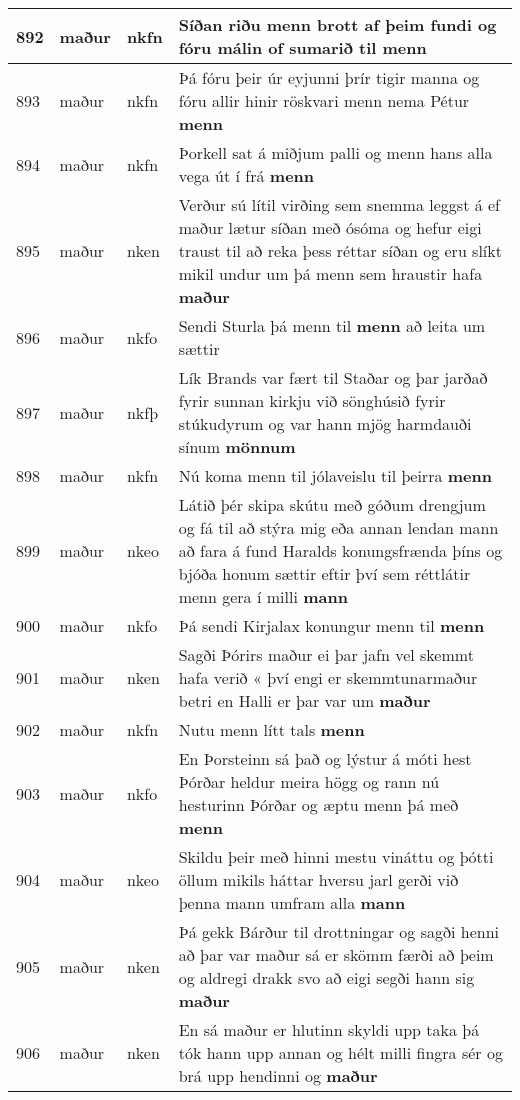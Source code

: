 \documentclass{article}
\begin{document}
\begin{longtable}{p{1cm}|p{1cm}|p{1cm}|p{13cm}}
\hline
892&maður&nkfn&Síðan riðu menn brott af þeim fundi og fóru málin of sumarið til \textbf{menn} \\
\hline
893&maður&nkfn&Þá fóru þeir úr eyjunni þrír tigir manna og fóru allir hinir röskvari menn nema Pétur \textbf{menn} \\
\hline
894&maður&nkfn&Þorkell sat á miðjum palli og menn hans alla vega út í frá \textbf{menn} \\
\hline
895&maður&nken&Verður sú lítil virðing sem snemma leggst á ef maður lætur síðan með ósóma og hefur eigi traust til að reka þess réttar síðan og eru slíkt mikil undur um þá menn sem hraustir hafa \textbf{maður} \\
\hline
896&maður&nkfo&Sendi Sturla þá menn til \textbf{menn} að leita um sættir\\
\hline
897&maður&nkfþ&Lík Brands var fært til Staðar og þar jarðað fyrir sunnan kirkju við sönghúsið fyrir stúkudyrum og var hann mjög harmdauði sínum \textbf{mönnum} \\
\hline
898&maður&nkfn&Nú koma menn til jólaveislu til þeirra \textbf{menn} \\
\hline
899&maður&nkeo&Látið þér skipa skútu með góðum drengjum og fá til að stýra mig eða annan lendan mann að fara á fund Haralds konungsfrænda þíns og bjóða honum sættir eftir því sem réttlátir menn gera í milli \textbf{mann} \\
\hline
900&maður&nkfo&Þá sendi Kirjalax konungur menn til \textbf{menn} \\
\hline
901&maður&nken&Sagði Þórirs maður ei þar jafn vel skemmt hafa verið « því engi er skemmtunarmaður betri en Halli er þar var um \textbf{maður} \\
\hline
902&maður&nkfn&Nutu menn lítt tals \textbf{menn} \\
\hline
903&maður&nkfo&En Þorsteinn sá það og lýstur á móti hest Þórðar heldur meira högg og rann nú hesturinn Þórðar og æptu menn þá með \textbf{menn} \\
\hline
904&maður&nkeo&Skildu þeir með hinni mestu vináttu og þótti öllum mikils háttar hversu jarl gerði við þenna mann umfram alla \textbf{mann} \\
\hline
905&maður&nken&Þá gekk Bárður til drottningar og sagði henni að þar var maður sá er skömm færði að þeim og aldregi drakk svo að eigi segði hann sig \textbf{maður} \\
\hline
906&maður&nken&En sá maður er hlutinn skyldi upp taka þá tók hann upp annan og hélt milli fingra sér og brá upp hendinni og \textbf{maður} \\

\end{longtable}
\end{document}
